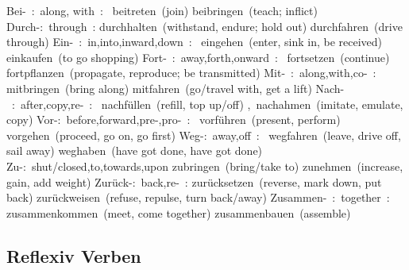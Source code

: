 \documentclass[a4paper,12pt]{article}
\begin{document}
\begin{adjustwidth}{2em}{0pt}
Bei- : along, with : 
beitreten (join)
beibringen (teach; inflict)
Durch-: through :
durchhalten (withstand, endure; hold out)
durchfahren (drive through)
Ein- : in,into,inward,down : 
eingehen (enter, sink in, be received)
einkaufen (to go shopping)
Fort- : away,forth,onward : 
fortsetzen (continue)
fortpflanzen (propagate, reproduce; be transmitted)
Mit- : along,with,co- : 
mitbringen (bring along)
mitfahren (go/travel with, get a lift)
Nach- : after,copy,re- : 
nachfüllen (refill, top up/off) , nachahmen (imitate, emulate, copy)
Vor-: before,forward,pre-,pro- : 
vorführen (present, perform)
vorgehen (proceed, go on, go first)
Weg-: away,off : 
wegfahren (leave, drive off, sail away)
weghaben (have got done, have got done)
Zu-: shut/closed,to,towards,upon
zubringen (bring/take to)
zunehmen (increase, gain, add weight)
Zurück-: back,re- :
zurücksetzen (reverse, mark down, put back)
zurückweisen (refuse, repulse, turn back/away)
Zusammen- : together :
zusammenkommen (meet, come together)
zusammenbauen (assemble)

\end{adjustwidth}

\subsection{\bf{Reflexiv Verben}}
\begin{adjustwidth}{2em}{0pt}
\label{sec:reflexiv_verben}



\end{adjustwidth}

\end{document}
